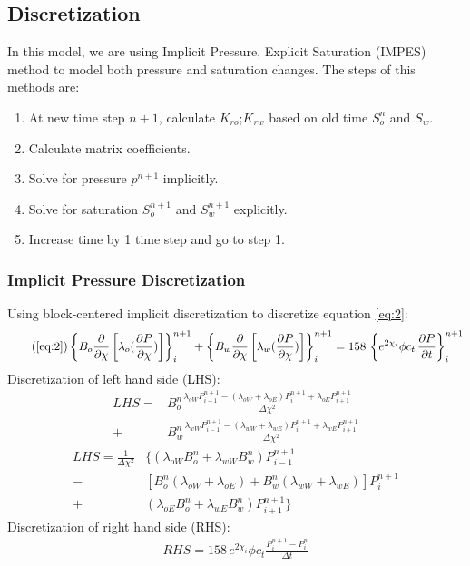 \documentclass[12pt,letterpaper,titlepage]{article}
\begin{document}
\subsection{Discretization}
In this model, we are using Implicit Pressure, Explicit Saturation (IMPES) method to model both pressure and saturation changes. The steps of this methods are:
\begin{enumerate}
\item At new time step $n+1$, calculate $K_{ro}$;$K_{rw}$ based on old time $S_o^n$ and $S_w$.
\item Calculate matrix coefficients.
\item Solve for pressure $p^{n+1}$ implicitly.
\item Solve for saturation $S_o^{n+1}$ and $S_w^{n+1}$ explicitly.
\item Increase time by 1 time step and go to step 1.
\end{enumerate}
\subsubsection{Implicit Pressure Discretization}
Using block-centered implicit discretization to discretize equation \ref{eq:2}:
\begin{equation*}\tag{\ref{eq:2}}
\left\{B_o\pdv{}{\chi}\left[\lambda_o(\pdv{P}{\chi})\right]\right\}_i^{n+1}+ \left\{B_w\pdv{}{\chi}\left[\lambda_w(\pdv{P}{\chi})\right]\right\}_i^{n+1}   = 158\, \left\{e^{2 \chi_i}\phi c_t\, \pdv{P}{t}\right\}^{n+1}_i
\end{equation*} 
Discretization of left hand side (LHS):
\begin{equation*}
\begin{aligned}
LHS = &B_o^{n}\frac{\lambda_{oW} P_{i-1}^{n+1}-(\lambda_{oW}+\lambda_{oE})P_i^{n+1}+\lambda_{oE} P^{n+1}_{i+1}}{\Delta\chi^2} \\+  &B_w^{n}\frac{\lambda_{wW} P_{i-1}^{n+1}-(\lambda_{wW}+\lambda_{wE})P_i^{n+1}+\lambda_{wE} P^{n+1}_{i+1}}{\Delta\chi^2}
\end{aligned}
\end{equation*}
\begin{equation}
\label{eq:LHS}
\begin{aligned}
LHS = \frac{1}{\Delta\chi^2}& \{(\lambda_{oW}B_o^n+\lambda_{wW}B_w^n)P_{i-1}^{n+1}\\-&\left[B_o^n(\lambda_{oW}+\lambda_{oE})+B_w^n(\lambda_{wW}+\lambda_{wE})\right]P_i^{n+1}\\+&(\lambda_{oE}B_o^n+\lambda_{wE}B_w^n)P_{i+1}^{n+1}\}
\end{aligned}
\end{equation}
Discretization of right hand side (RHS):
\begin{equation}
\label{eq:RHS}
\begin{aligned}
RHS = 158\,e^{2\chi_i}\phi c_t \frac{P_i^{n+1}-P_i^n}{\Delta t}
\end{aligned}
\end{equation}
\end{document}
